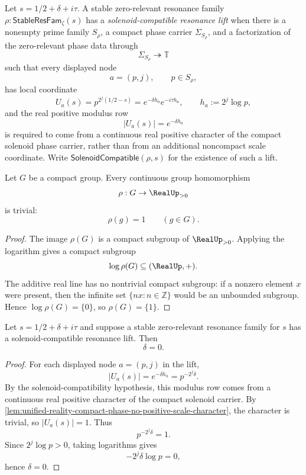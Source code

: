 \begin{definition}
\label{def:unified-reality-solenoid-compatible-resonance-lift}
Let $s=1/2+\delta+i\tau$.  A stable zero-relevant resonance family
$\rho:\mathsf{StableResFam}_{\zeta}(s)$ has a
\emph{solenoid-compatible resonance lift} when there is a nonempty prime
family $S_{\rho}$, a compact phase carrier $\Sigma_{S_{\rho}}$, and a
factorization of the zero-relevant phase data through
$$
\Sigma_{S_{\rho}}\twoheadrightarrow\mathbb T
$$
such that every displayed node
$$
a=(p,j),
\qquad
p\in S_{\rho},
$$
has local coordinate
$$
U_a(s)
=
p^{2^j(1/2-s)}
=
e^{-\delta h_a}e^{-i\tau h_a},
\qquad
h_a:=2^j\log p,
$$
and the real positive modulus row
$$
|U_a(s)|=e^{-\delta h_a}
$$
is required to come from a continuous real positive character of the
compact solenoid phase carrier, rather than from an additional noncompact
scale coordinate.
Write $\mathsf{SolenoidCompatible}(\rho,s)$ for the existence of such a
lift.
\end{definition}

\begin{lemma}
\label{lem:unified-reality-compact-phase-no-positive-scale-character}
Let $G$ be a compact group.  Every continuous group homomorphism
$$
\rho:G\to\RealUp_{>0}
$$
is trivial:
$$
\rho(g)=1
\qquad
(g\in G).
$$
\end{lemma}

\begin{proof}
The image $\rho(G)$ is a compact subgroup of $\RealUp_{>0}$.  Applying
the logarithm gives a compact subgroup
$$
\log\rho(G)\subseteq(\RealUp,+).
$$
The additive real line has no nontrivial compact subgroup: if a nonzero
element $x$ were present, then the infinite set $\{nx:n\in\mathbb Z\}$
would be an unbounded subgroup.  Hence $\log\rho(G)=\{0\}$, so
$\rho(G)=\{1\}$.
\end{proof}

\begin{theorem}
\label{thm:unified-reality-solenoid-compatible-resonance-no-normal-scale}
Let $s=1/2+\delta+i\tau$ and suppose a stable zero-relevant resonance
family for $s$ has a solenoid-compatible resonance lift.  Then
$$
\delta=0.
$$
\end{theorem}

\begin{proof}
For each displayed node $a=(p,j)$ in the lift,
$$
|U_a(s)|
=
e^{-\delta h_a}
=
p^{-2^j\delta}.
$$
By the solenoid-compatibility hypothesis, this modulus row comes from a
continuous real positive character of the compact solenoid carrier.
By
\autoref{lem:unified-reality-compact-phase-no-positive-scale-character},
the character is trivial, so $|U_a(s)|=1$.  Thus
$$
p^{-2^j\delta}=1.
$$
Since $2^j\log p>0$, taking logarithms gives
$$
-2^j\delta\log p=0,
$$
hence $\delta=0$.
\end{proof}

